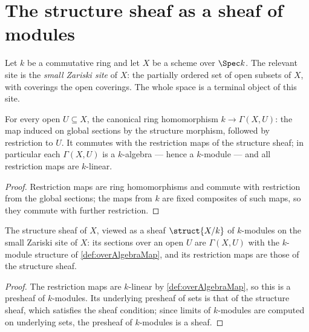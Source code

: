 \section{The structure sheaf as a sheaf of modules}

Let \(k\) be a commutative ring and let \(X\) be a scheme over \(\Spec k\). The relevant site
is the \emph{small Zariski site} of \(X\): the partially ordered set of open subsets of
\(X\), with coverings the open coverings. The whole space is a terminal object of this site.

\begin{definition}
  \label{def:overAlgebraMap}
  \leanok
  For every open \(U \subseteq X\), the canonical ring homomorphism \(k \to \Gamma(X, U)\):
  the map induced on global sections by the structure morphism, followed by restriction to
  \(U\). It commutes with the restriction maps of the structure sheaf; in particular each
  \(\Gamma(X, U)\) is a \(k\)-algebra --- hence a \(k\)-module --- and all restriction maps
  are \(k\)-linear.
\end{definition}
\begin{proof}
  \leanok
  Restriction maps are ring homomorphisms and commute with restriction from the global
  sections; the maps from \(k\) are fixed composites of such maps, so they commute with
  further restriction.
\end{proof}

\begin{definition}
  \label{def:moduleKSheaf}
  \leanok
  The structure sheaf of \(X\), viewed as a sheaf \(\struct{X/k}\) of \(k\)-modules on the
  small Zariski site of \(X\): its sections over an open \(U\) are \(\Gamma(X, U)\) with the
  \(k\)-module structure of \ref{def:overAlgebraMap}, and its restriction maps are those of
  the structure sheaf.
\end{definition}
\begin{proof}
  \leanok
  The restriction maps are \(k\)-linear by \ref{def:overAlgebraMap}, so this is a presheaf of
  \(k\)-modules. Its underlying presheaf of sets is that of the structure sheaf, which
  satisfies the sheaf condition; since limits of \(k\)-modules are computed on underlying
  sets, the presheaf of \(k\)-modules is a sheaf.
\end{proof}

